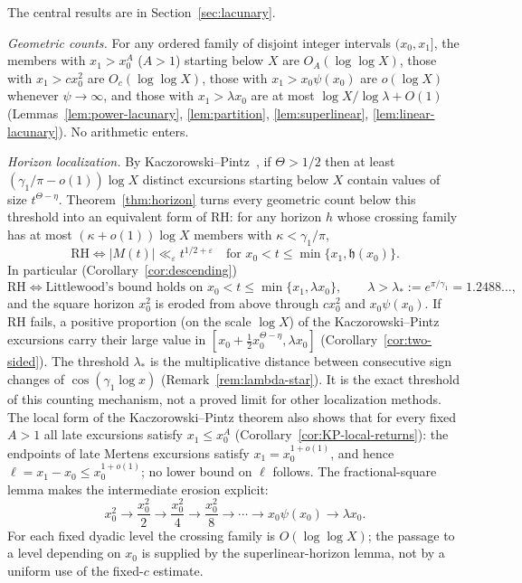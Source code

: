 \documentclass[11pt]{amsart}
\numberwithin{equation}{section}
\theoremstyle{plain}
\theoremstyle{definition}
\theoremstyle{remark}
\newcommand{\eps}{\varepsilon}
\begin{document}
The central results are in Section~\ref{sec:lacunary}.

\smallskip\noindent\emph{Geometric counts.} For any ordered family of
disjoint integer intervals $(x_{0},x_{1}]$, the members with $x_1>x_0^A$
($A>1$) starting below $X$ are $O_A(\log\log X)$, those with
$x_1>cx_0^2$ are $O_c(\log\log X)$, those with $x_1>x_0\psi(x_0)$ are
$o(\log X)$ whenever $\psi\to\infty$, and those with $x_1>\lambda x_0$ are at
most $\log X/\log\lambda+O(1)$ (Lemmas~\ref{lem:power-lacunary},
\ref{lem:partition}, \ref{lem:superlinear}, \ref{lem:linear-lacunary}). No
arithmetic enters.

\smallskip\noindent\emph{Horizon localization.} By
Kaczorowski--Pintz~\cite{KP86}, if $\Theta>1/2$ then at least
$(\gamma_1/\pi-o(1))\log X$ distinct excursions starting below $X$ contain
values of size $t^{\Theta-\eta}$. Theorem~\ref{thm:horizon} turns every
geometric count below this threshold into an equivalent form of RH: for any
horizon $h$ whose crossing family has at most $(\kappa+o(1))\log X$ members
with $\kappa<\gamma_1/\pi$,
\[
\mathrm{RH}\iff |M(t)|\ll_\eps t^{1/2+\eps}\quad\text{for }x_0<t\le\min\{x_1,\mathfrak h(x_0)\}.
\]
In particular (Corollary~\ref{cor:descending})
\[
\mathrm{RH}\iff\text{Littlewood's bound holds on }x_0<t\le\min\{x_1,\lambda x_0\},
\qquad\lambda>\lambda_*:=e^{\pi/\gamma_1}=1.2488\ldots,
\]
and the square horizon $x_0^2$ is eroded from above through $cx_0^2$ and
$x_0\psi(x_0)$. If RH fails, a positive proportion (on the scale $\log X$) of the
Kaczorowski--Pintz excursions carry their large value in
$[x_0+\frac12x_0^{\Theta-\eta},\lambda x_0]$ (Corollary~\ref{cor:two-sided}). The threshold $\lambda_*$ is the multiplicative distance
between consecutive sign changes of $\cos(\gamma_1\log x)$
(Remark~\ref{rem:lambda-star}). It is the exact threshold of this counting mechanism, not a
proved limit for other localization methods. The local form of the
Kaczorowski--Pintz theorem also shows that for every fixed $A>1$ all late
excursions satisfy $x_1\le x_0^A$ (Corollary~\ref{cor:KP-local-returns}):
the endpoints of late Mertens excursions satisfy $x_1=x_0^{1+o(1)}$, and
hence $\ell=x_1-x_0\le x_0^{1+o(1)}$; no lower bound on $\ell$ follows.  The fractional-square lemma makes the
intermediate erosion explicit:
\[
x_0^2\longrightarrow \frac{x_0^2}{2}\longrightarrow
\frac{x_0^2}{4}\longrightarrow\frac{x_0^2}{8}\longrightarrow\cdots
\longrightarrow x_0\psi(x_0)\longrightarrow\lambda x_0.
\]
For each fixed dyadic level the crossing family is $O(\log\log X)$; the
passage to a level depending on $x_0$ is supplied by the superlinear-horizon
lemma, not by a uniform use of the fixed-$c$ estimate.
\end{document}
